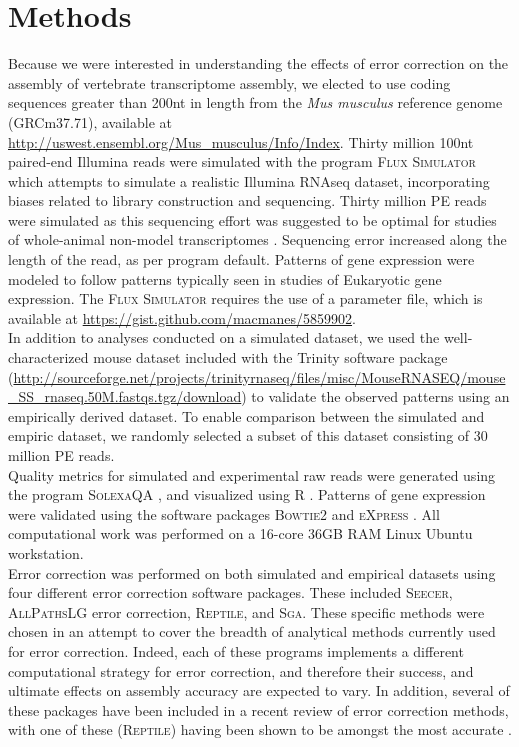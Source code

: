 \documentclass[11pt]{article}
\begin{document}
\section*{Methods}
Because we were interested in understanding the effects of error correction on the assembly of vertebrate transcriptome assembly, we elected to use coding sequences greater than 200nt in length from the \textit{Mus musculus} reference genome (GRCm37.71), available at \url{http://uswest.ensembl.org/Mus_musculus/Info/Index}.  Thirty million 100nt paired-end Illumina reads were simulated with the program \textsc{Flux Simulator} \citep{Griebel:2012ti} which attempts to simulate a realistic Illumina RNAseq dataset, incorporating biases related to library construction and sequencing. Thirty million PE reads were simulated as this sequencing effort was suggested to be optimal for studies of whole-animal non-model transcriptomes \citep{Francis:2013gc}. Sequencing error increased along the length of the read, as per program default. Patterns of gene expression were modeled to follow patterns typically seen in studies of Eukaryotic gene expression. The \textsc{Flux Simulator} requires the use of a parameter file, which is available at \url{https://gist.github.com/macmanes/5859902}.  \\

\noindent
In addition to analyses conducted on a simulated dataset, we used the well-characterized mouse dataset included with the Trinity software package (\url{http://sourceforge.net/projects/trinityrnaseq/files/misc/MouseRNASEQ/mouse_SS_rnaseq.50M.fastqs.tgz/download}) to validate the observed patterns using an empirically derived dataset.  To enable comparison between the simulated and empiric dataset, we randomly selected a subset of this dataset consisting of 30 million PE reads. \\

\noindent
Quality metrics for simulated and experimental raw reads were generated using the program \textsc{SolexaQA} \citep{Cox:2010ch}, and visualized using R \citep{RALanguageandEn:wf}. Patterns of gene expression were validated using the software packages \textsc{Bowtie2} \citep{Trapnell:2010kd} and \textsc{eXpress} \citep{Roberts:2012dh}. All computational work was performed on a 16-core 36GB RAM Linux Ubuntu workstation. \\

\noindent
Error correction was performed on both simulated and empirical datasets using four different error correction software packages. These included \textsc{Seecer}, \textsc{AllPathsLG} error correction, \textsc{Reptile}, and \textsc{Sga}. These specific methods were chosen in an attempt to cover the breadth of analytical methods currently used for error correction. Indeed, each of these programs implements a different computational strategy for error correction, and therefore their success, and ultimate effects on assembly accuracy are expected to vary.  In addition, several of these packages have been included in a recent review of error correction methods, with one of these (\textsc{Reptile}) having been shown to be amongst the most accurate \citep{Yang:2013ck}.  \\
\end{document}
